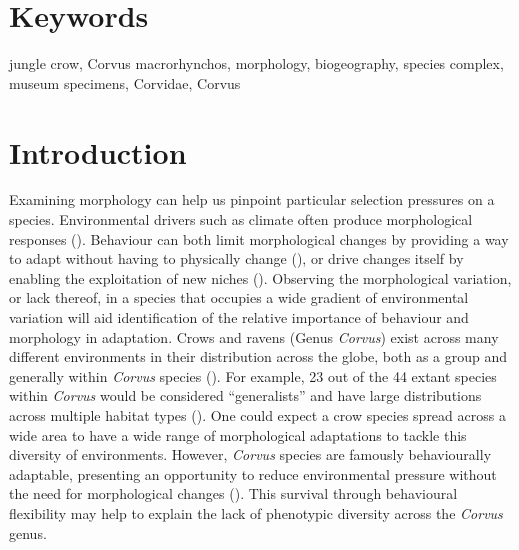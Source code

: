 \documentclass[10pt,a4paper]{article}
\begin{document}
\section*{Keywords}

jungle crow, Corvus macrorhynchos, morphology, biogeography, species complex, museum specimens, Corvidae, Corvus

\clearpage
\pagestyle{fancy}

\section{Introduction}\label{introduction}

Examining morphology can help us pinpoint particular selection pressures on a species.
Environmental drivers such as climate often produce morphological responses ().
Behaviour can both limit morphological changes by providing a way to adapt without having to physically change (), or drive changes itself by enabling the exploitation of new niches ().
Observing the morphological variation, or lack thereof, in a species that occupies a wide gradient of environmental variation will aid identification of the relative importance of behaviour and morphology in adaptation.
Crows and ravens (Genus \emph{Corvus}) exist across many different environments in their distribution across the globe, both as a group and generally within \emph{Corvus} species ().
For example, 23 out of the 44 extant species within \emph{Corvus} would be considered ``generalists'' and have large distributions across multiple habitat types ().
One could expect a crow species spread across a wide area to have a wide range of morphological adaptations to tackle this diversity of environments.
However, \emph{Corvus} species are famously behaviourally adaptable, presenting an opportunity to reduce environmental pressure without the need for morphological changes ().
This survival through behavioural flexibility may help to explain the lack of phenotypic diversity across the \emph{Corvus} genus.
\end{document}
